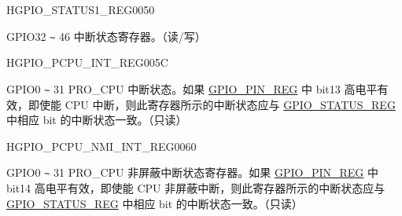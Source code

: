 \begin{register}{H}{GPIO\_STATUS1\_REG}{\hexprefix{}0050}\label{regdesc:GPIOSTATUS1REG}
%
%
\regnewline%
\begin{regdesc}\begin{reglist}
\label{fielddesc:GPIOSTATUS1INTERRUPT}\item [GPIO\_STATUS1\_INTERRUPT] GPIO32 \verb+~+ 46 中断状态寄存器。（读/写）
\end{reglist}\end{regdesc}
\end{register}


\begin{register}{H}{GPIO\_PCPU\_INT\_REG}{\hexprefix{}005C}\label{regdesc:GPIOPCPUINTREG}
%
\regnewline%
\begin{regdesc}\begin{reglist}
\label{fielddesc:GPIOPROCPUINT}\item [GPIO\_PROCPU\_INT] GPIO0 \verb+~+ 31 PRO\_CPU 中断状态。如果 \hyperref[regdesc:GPIOPINNREG]{GPIO\_PIN\_REG} 中 bit13 高电平有效，即使能 CPU 中断，则此寄存器所示的中断状态应与 \hyperref[regdesc:GPIOSTATUSREG]{GPIO\_STATUS\_REG} 中相应 bit 的中断状态一致。（只读）
\end{reglist}\end{regdesc}
\end{register}


\begin{register}{H}{GPIO\_PCPU\_NMI\_INT\_REG}{\hexprefix{}0060}\label{regdesc:GPIOPCPUNMIINTREG}
%
\regnewline%
\begin{regdesc}\begin{reglist}
\label{fielddesc:GPIOPROCPUNMIINT}\item [GPIO\_PROCPU\_NMI\_INT] GPIO0 \verb+~+ 31 PRO\_CPU 非屏蔽中断状态寄存器。如果 \hyperref[regdesc:GPIOPINNREG]{GPIO\_PIN\_REG} 中 bit14 高电平有效，即使能 CPU 非屏蔽中断，则此寄存器所示的中断状态应与 \hyperref[regdesc:GPIOSTATUSREG]{GPIO\_STATUS\_REG} 中相应 bit 的中断状态一致。（只读）
\end{reglist}\end{regdesc}
\end{register}





